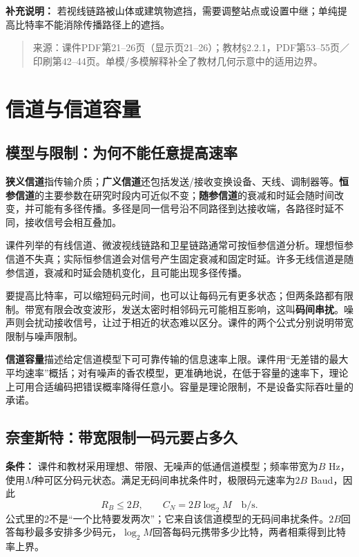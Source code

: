 \textbf{补充说明：} 若视线链路被山体或建筑物遮挡，需要调整站点或设置中继；单纯提高比特率不能消除传播路径上的遮挡。

\begin{quote}\small 来源：课件PDF第21--26页（显示页21--26）；教材§2.2.1，PDF第53--55页／印刷第42--44页。单模/多模解释补全了教材几何示意中的适用边界。\end{quote}
\annotationarea[4]

\section{信道与信道容量}\label{sec:channel-capacity}
\subsection{模型与限制：为何不能任意提高速率}
\textbf{狭义信道}指传输介质；\textbf{广义信道}还包括发送/接收变换设备、天线、调制器等。\textbf{恒参信道}的主要参数在研究时段内可近似不变；\textbf{随参信道}的衰减和时延会随时间改变，并可能有多径传播。多径是同一信号沿不同路径到达接收端，各路径时延不同，接收信号会相互叠加。

课件列举的有线信道、微波视线链路和卫星链路通常可按恒参信道分析。理想恒参信道不失真；实际恒参信道会对信号产生固定衰减和固定时延。许多无线信道是随参信道，衰减和时延会随机变化，且可能出现多径传播。

要提高比特率，可以缩短码元时间，也可以让每码元有更多状态；但两条路都有限制。带宽有限会改变波形，发送太密时相邻码元可能相互影响，这叫\textbf{码间串扰}。噪声则会扰动接收信号，让过于相近的状态难以区分。课件的两个公式分别说明带宽限制与噪声限制。

\textbf{信道容量}描述给定信道模型下可可靠传输的信息速率上限。课件用“无差错的最大平均速率”概括；对有噪声的香农模型，更准确地说，在低于容量的速率下，理论上可用合适编码把错误概率降得任意小。容量是理论限制，不是设备实际吞吐量的承诺。
\annotationarea[4]

\subsection{奈奎斯特：带宽限制一码元要占多久}
\textbf{条件：} 课件和教材采用理想、带限、无噪声的低通信道模型；频率带宽为$B$ Hz，使用$M$种可区分码元状态。满足无码间串扰条件时，极限码元速率为$2B$ Baud，因此
\[
 R_B\leq2B,\qquad C_N=2B\log_2M\quad\text{b/s}.
\]
公式里的2不是“一个比特要发两次”；它来自该信道模型的无码间串扰条件。$2B$回答每秒最多安排多少码元，$\log_2M$回答每码元携带多少比特，两者相乘得到比特率上界。

